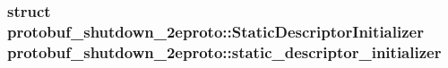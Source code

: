 \subsubsection[{\texorpdfstring{static\+\_\+descriptor\+\_\+initializer}{static_descriptor_initializer}}]{\setlength{\rightskip}{0pt plus 5cm}struct {\bf protobuf\+\_\+shutdown\+\_\+2eproto\+::\+Static\+Descriptor\+Initializer}  protobuf\+\_\+shutdown\+\_\+2eproto\+::static\+\_\+descriptor\+\_\+initializer}\hypertarget{namespaceprotobuf__shutdown__2eproto_a01dfcfafd9651753066e44cd04be244d}{}\label{namespaceprotobuf__shutdown__2eproto_a01dfcfafd9651753066e44cd04be244d}
